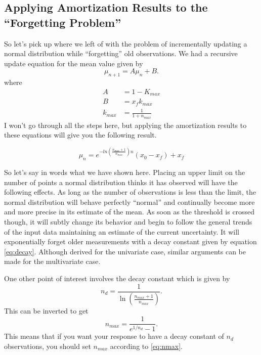 \documentclass[../../main.tex]{subfiles}
\begin{document}
\subsection{Applying Amortization Results to the ``Forgetting Problem''}
So let's pick up where we left of with the problem of incrementally updating a
normal distribution while ``forgetting'' old observations.  We had a recursive
update equation for the mean value given by
\begin{equation}
    \mu_{n+1} = A \mu_n + B. \nonumber
\end{equation}
where
\begin{align}
    A &= 1 - K_{max} \nonumber\\
    B &= x_f k_{max} \nonumber\\
    k_{max} &= \frac{1}{1+n_{max}}
\end{align}
I won't go through all the steps here, but applying the amortization results
to these equations will give you the following result.

\begin{equation}
    \label{eq:expsolution}
    \mu_n = e^{-ln \left( \frac{n_{max} + 1}{n_{max}}  \right) n}
          \left( x_0 - x_f \right) + x_f
\end{equation}

So let's say in words what we have shown here.  Placing an upper limit on the
number of points a normal distribution thinks it has observed will have the
following effects.  As long as the number of observations is less than the
limit, the normal distribution will behave perfectly ``normal'' and
continually become more and more precise in its estimate of the mean.  As soon
as the threshold is crossed though, it will subtly change its behavior and
begin to follow the general trends of the input data maintaining an estimate
of the current uncertainty.  It will exponentially forget older measurements
with a decay constant given by equation \eqref{eq:decay}. Although derived for
the univariate case, similar arguments can be made for the multivariate case.

One other point of interest involves the decay constant which is given by
\begin{equation}
    n_d = \frac{1}{\ln \left( \frac{n_{max} + 1}{n_{max}}  \right)}.
\end{equation}
This can be inverted to get
\begin{equation}
    \label{eq:nmax}
    n_{max} = \frac{1}{e^{1 / n_d} - 1}.
\end{equation}
This means that if you want your response to have a decay constant of $n_d$
observations, you should set $n_{max}$ according to \eqref{eq:nmax}.
\end{document}
